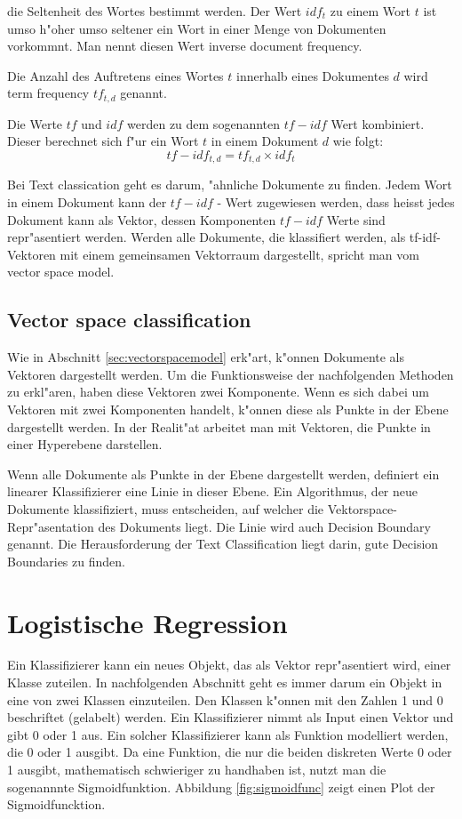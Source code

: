 \documentclass[12pt,a4paper,twoside]{article}
\begin{document}
die Seltenheit des Wortes bestimmt werden. Der Wert $idf_t$ zu einem Wort $t$ ist umso h"oher umso seltener ein Wort in einer Menge von Dokumenten vorkommnt. Man nennt diesen Wert inverse document frequency\cite{manning08}.

Die Anzahl des Auftretens eines Wortes $t$ innerhalb eines Dokumentes $d$ wird term frequency $tf_{t,d}$ genannt.

Die Werte $tf$ und $idf$ werden zu dem sogenannten $tf-idf$ Wert kombiniert. Dieser berechnet sich f"ur ein Wort $t$ in einem Dokument $d$ wie folgt:
\[
tf-idf_{t,d} = tf_{t,d} \times idf_t
\]

Bei Text classication geht es darum, "ahnliche Dokumente zu finden. Jedem Wort in einem Dokument kann der $tf-idf$ - Wert zugewiesen werden, dass heisst jedes Dokument kann als Vektor, dessen Komponenten $tf-idf$ Werte sind repr"asentiert werden. Werden alle Dokumente, die klassifiert werden, als tf-idf-Vektoren mit einem gemeinsamen Vektorraum dargestellt, spricht man vom vector space model.

\subsection{Vector space classification}
\label{sec:vectorclassification}

Wie in Abschnitt \ref{sec:vectorspacemodel} erk"art, k"onnen Dokumente als Vektoren dargestellt werden. Um die Funktionsweise der nachfolgenden Methoden zu erkl"aren, haben diese Vektoren zwei Komponente. Wenn es sich dabei um Vektoren mit zwei Komponenten handelt, k"onnen diese als Punkte in der Ebene dargestellt werden. In der Realit"at arbeitet man mit Vektoren, die Punkte in einer Hyperebene darstellen.

Wenn alle Dokumente als Punkte in der Ebene dargestellt werden, de\-finiert ein linearer Klassifizierer eine Linie in dieser Ebene. Ein Algorithmus, der neue Dokumente klassifiziert, muss entscheiden, auf welcher die Vektorspace-Repr"a\-sentation des Dokuments liegt. Die Linie wird auch Decision Boundary genannt. Die Herausforderung der Text Classification liegt darin, gute Decision Boundaries zu finden.

\section{Logistische Regression}
\label{sec:logisticreg}

Ein Klassifizierer kann ein neues Objekt, das als Vektor repr"asentiert wird, einer Klasse zuteilen. In nachfolgenden Abschnitt geht es immer darum ein Objekt in eine von zwei Klassen einzuteilen. Den Klassen k"onnen mit den Zahlen 1 und 0 beschriftet (gelabelt) werden. Ein Klassifizierer nimmt als Input einen Vektor und gibt 0 oder 1 aus. Ein solcher Klassifizierer kann als Funktion modelliert werden, die 0 oder 1 ausgibt. Da eine Funktion, die nur die beiden diskreten Werte 0 oder 1 ausgibt, mathematisch schwieriger zu handhaben ist, nutzt man die sogenannnte Sigmoidfunktion. Abbildung \ref{fig:sigmoidfunc} zeigt einen Plot der Sigmoidfuncktion. 
\end{document}
